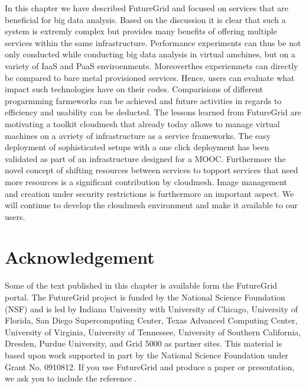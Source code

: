 \documentclass{article}
\begin{document}
In this chapter we have described FutureGrid and focused on services
that are beneficial for big data analysis. Based on the discussion it
is clear that such a system is extremly complex but provides many
benefits of offering multiple services within the same
infrastructure. Performance experiments can thus be not only conducted
while conducting big data analysis in virtual amchines, but on a
variety of IaaS and PaaS enviroenments. Moreoverthes experiemnets can
directly be compared to bare metal provisioned services. Hence, users
can evaluate what impact such technologies have on their
codes. Comparisions of different progarmming farmeworks can be
achieved and future activities in regards to efficiency and usability
can be deducted. The lessons learned from FutureGrid are motivating a
toolkit cloudmesh that already today allows to manage virtual machines
on a avriety of infrastructure as a service frameworks. The easy
deployment of sophisticated setups with a one click deployment has
been validated as part of an infrastructure designed for a
MOOC. Furthermore the novel concept of shifting resources
\cite{las08federated-cloud} between
services to topport services that need more resources is a significant
contribution by cloudmesh. Image management and creation under
security restrictions \cite{fg-1295}  is
furthermore an important aspect. We will continue to develop the
cloudmesh environment and make it available to our users. 


\section*{Acknowledgement}

Some of the text published in this chapter is available form the
FutureGrid portal. The FutureGrid project is funded by the National
Science Foundation (NSF) and is led by Indiana University with
University of Chicago, University of Florida, San Diego Supercomputing
Center, Texas Advanced Computing Center, University of Virginia,
University of Tennessee, University of Southern California, Dresden,
Purdue University, and Grid 5000 as partner sites. This material is
based upon work supported in part by the National Science Foundation
under Grant No. 0910812. If you use FutureGrid and produce a paper or
presentation, we ask you to include the reference
\cite{las2010gce,las12fg-bookchapter}.






%
\end{document}
